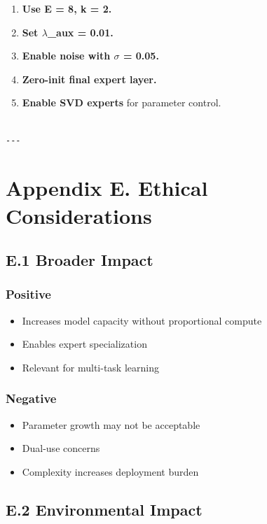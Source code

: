 \begin{enumerate}
\item \textbf{Use E = 8, k = 2.}
\item \textbf{Set $\lambda$\_aux = 0.01.}
\item \textbf{Enable noise with $\sigma$ = 0.05.}
\item \textbf{Zero-init final expert layer.}
\item \textbf{Enable SVD experts} for parameter control.
\end{enumerate}
\begin{lstlisting}

---
\end{lstlisting}

\section{Appendix E. Ethical Considerations}

\subsection{E.1 Broader Impact}

\subsubsection{Positive}
\begin{itemize}
\item Increases model capacity without proportional compute
\item Enables expert specialization
\item Relevant for multi-task learning

\end{itemize}
\subsubsection{Negative}
\begin{itemize}
\item Parameter growth may not be acceptable
\item Dual-use concerns
\item Complexity increases deployment burden

\end{itemize}
\subsection{E.2 Environmental Impact}


